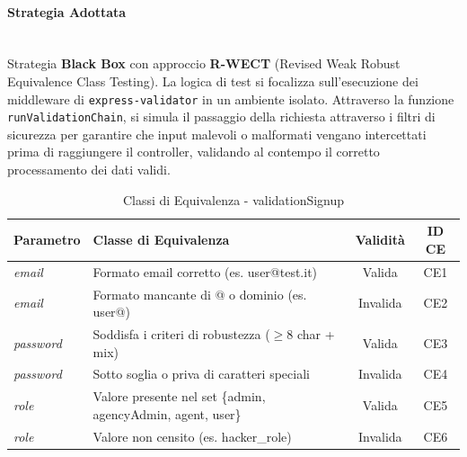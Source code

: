 \documentclass{article}
\begin{document}
\paragraph{Strategia Adottata} \mbox{} \\
Strategia \textbf{Black Box} con approccio \textbf{R-WECT} (Revised Weak Robust Equivalence Class Testing). La logica di test si focalizza sull'esecuzione dei middleware di \texttt{express-validator} in un ambiente isolato. Attraverso la funzione \texttt{runValidationChain}, si simula il passaggio della richiesta attraverso i filtri di sicurezza per garantire che input malevoli o malformati vengano intercettati prima di raggiungere il controller, validando al contempo il corretto processamento dei dati validi.

\newpage

\renewcommand{\arraystretch}{1.5}
\begin{table}[H]
    \centering
    \caption{Classi di Equivalenza - validationSignup}
    \begin{tabularx}{\textwidth}{|l|X|c|c|}
        \hline
        \rowcolor{DarkBlue}
        \textbf{\color{white}Parametro} & \textbf{\color{white}Classe di Equivalenza}                 & \textbf{\color{white}Validità} & \textbf{\color{white}ID CE} \\ \hline
        \rowcolor[gray]{0.95}
        \textit{email}                  & Formato email corretto (es. user@test.it)                   & Valida                         & CE1                         \\ \hline
        \textit{email}                  & Formato mancante di @ o dominio (es. user@)                 & Invalida                       & CE2                         \\ \hline
        \rowcolor[gray]{0.95}
        \textit{password}               & Soddisfa i criteri di robustezza ($\ge$8 char + mix)        & Valida                         & CE3                         \\ \hline
        \textit{password}               & Sotto soglia o priva di caratteri speciali                  & Invalida                       & CE4                         \\ \hline
        \rowcolor[gray]{0.95}
        \textit{role}                   & Valore presente nel set \{admin, agencyAdmin, agent, user\} & Valida                         & CE5                         \\ \hline
        \textit{role}                   & Valore non censito (es. hacker\_role)                       & Invalida                       & CE6                         \\ \hline
    \end{tabularx}
\end{table}
\end{document}
